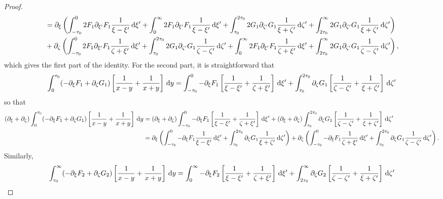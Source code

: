 \documentclass[10pt,reqno,oneside,a4paper, landscape]{article}
\begin{document}
\begin{proof}
\begin{align*}
&= \partial_\xi \left( \int^{0}_{-\tau_0} 2 F_1\partial_{\xi'}F_1  \frac{1}{\xi -\xi'} \,\mathrm{d} \xi' + \int_{0}^\infty 2 F_1\partial_{\xi'}F_1  \frac{1}{\xi -\xi'} \,\mathrm{d} \xi'  + \int_{\tau_0}^{2\tau_0} 2 G_1 \partial_{\zeta'} G_1 \frac{1}{\xi + \zeta'} \,\mathrm{d} \zeta' + \int_{2\tau_0}^{\infty}  2 G_1 \partial_{\zeta'} G_1 \frac{1}{\xi + \zeta'} \,\mathrm{d} \zeta'\right) \\
&+ \partial_{\zeta} \left(  \int^{0}_{-\tau_0} 2 F_1\partial_{\xi'}F_1 \frac{1}{\zeta +\xi'} \,\mathrm{d} \xi' + \int_{\tau_0}^{2\tau_0} 2 G_1 \partial_{\zeta'} G_1 \frac{1}{\zeta - \zeta'} \,\mathrm{d} \zeta' + \int_{0}^\infty 2 F_1\partial_{\xi'}F_1 \frac{1}{\zeta +\xi'} \,\mathrm{d} \xi' + \int_{2\tau_0}^{\infty}  2 G_1 \partial_{\zeta'} G_1 \frac{1}{\zeta - \zeta'} \,\mathrm{d} \zeta' \right),
\end{align*}
which gives the first part of the identity. For the second part, it is straightforward that 
\begin{align*}
\int_0^{\tau_0} (-\partial_\xi F_1 + \partial_\zeta G_1) \left[ \frac{1}{x-y} + \frac{1}{x+y} \right] \,\mathrm{d} y = \int^0_{-\tau_0} -\partial_\xi F_1 \left[ \frac{1}{\xi - \xi'} + \frac{1}{\zeta + \xi'} \right] \,\mathrm{d} \xi' + \int^{2\tau_0}_{\tau_0} \partial_\zeta G_1 \left[ \frac{1}{\zeta - \zeta'} + \frac{1}{\xi + \zeta'}  \right] \,\mathrm{d} \zeta'
\end{align*}
so that 
\begin{align*}
(\partial_\xi + \partial_\zeta)\int_0^{\tau_0} (-\partial_\xi F_1 + \partial_\zeta G_1) \left[ \frac{1}{x-y} + \frac{1}{x+y} \right] \,\mathrm{d} y &= (\partial_\xi + \partial_\zeta) \int^0_{-\tau_0} -\partial_\xi F_1 \left[ \frac{1}{\xi - \xi'} + \frac{1}{\zeta + \xi'} \right] \,\mathrm{d} \xi' + (\partial_\xi + \partial_\zeta) \int^{2\tau_0}_{\tau_0} \partial_\zeta G_1 \left[ \frac{1}{\zeta - \zeta'} + \frac{1}{\xi + \zeta'}  \right] \,\mathrm{d} \zeta' \\
&= \partial_\xi \left( \int^0_{-\tau_0} -\partial_\xi F_1 \frac{1}{\xi - \xi'} \,\mathrm{d} \xi' + \int^{2\tau_0}_{\tau_0} \partial_\zeta G_1 \frac{1}{\xi + \zeta'} \,\mathrm{d} \zeta' \right) + \partial_\zeta \left( \int^0_{-\tau_0} -\partial_\xi F_1  \frac{1}{\zeta + \xi'}  \,\mathrm{d} \xi' + \int^{2\tau_0}_{\tau_0} \partial_\zeta G_1 \frac{1}{\zeta - \zeta'} \,\mathrm{d} \zeta' \right).
\end{align*}
Similarly, 
\begin{align*}
\int_{\tau_0}^\infty (- \partial_\xi F_2+ \partial_\zeta G_2) \left[ \frac{1}{x-y} + \frac{1}{x+y} \right] \D y = \int_0^{\infty} -\partial_\xi F_2 \left[ \frac{1}{\xi - \xi'} + \frac{1}{\zeta + \xi'} \right] \D \xi' + \int_{2\tau_0}^{\infty} \partial_\zeta G_2 \left[ \frac{1}{\zeta - \zeta'} + \frac{1}{\xi + \zeta'}  \right] \D \zeta'

\end{align*}
\end{proof}
\end{document}
